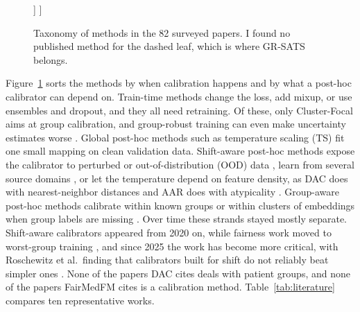 \documentclass[sigconf,nonacm]{acmart}
\begin{document}
\begin{figure}[t]
\begin{forest}
      ]
    ]
  \end{forest}
  \caption{Taxonomy of methods in the 82 surveyed papers. I found no published method for the dashed leaf, which is where GR-SATS belongs.}
  \label{fig:taxonomy}
\end{figure}

Figure~\ref{fig:taxonomy} sorts the methods by when calibration happens and by what a post-hoc calibrator can depend on. Train-time methods change the loss, add mixup, or use ensembles and dropout, and they all need retraining. Of these, only Cluster-Focal \cite{shui2023clusterfocal} aims at group calibration, and group-robust training can even make uncertainty estimates worse \cite{mehta2023evaluating}. Global post-hoc methods such as temperature scaling (TS) \cite{guo2017calibration} fit one small mapping on clean validation data. Shift-aware post-hoc methods expose the calibrator to perturbed or out-of-distribution (OOD) data \cite{tomani2021posthoc,roschewitz2025where}, learn from several source domains \cite{gong2021confidence,yu2022multidomain}, or let the temperature depend on feature density, as DAC does with nearest-neighbor distances and AAR does with atypicality \cite{tomani2023dac,yuksekgonul2023atypicality}. Group-aware post-hoc methods calibrate within known groups \cite{hebertjohnson2018multicalibration,shen2025calin} or within clusters of embeddings when group labels are missing \cite{salvador2022faircal,yang2023beyond}. Over time these strands stayed mostly separate. Shift-aware calibrators appeared from 2020 on, while fairness work moved to worst-group training \cite{sagawa2020groupdro}, and since 2025 the work has become more critical, with Roschewitz et al.\ finding that calibrators built for shift do not reliably beat simpler ones \cite{roschewitz2025where}. None of the papers DAC cites deals with patient groups, and none of the papers FairMedFM cites is a calibration method. Table~\ref{tab:literature} compares ten representative works.
\end{document}
